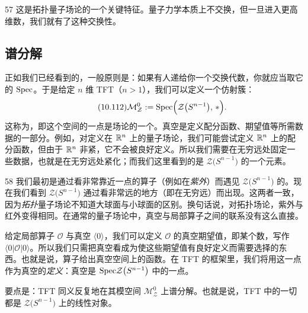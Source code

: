 \begin{srcrem}{57}
这是拓扑量子场论的一个关键特征。量子力学本质上不交换，但一旦进入更高维数，我们就有了这种交换性。
\end{srcrem}


\subsection{谱分解}\label{sec:10-6-2}

正如我们已经看到的，一般原则是：如果有人递给你一个交换代数，你就应当取它的 $\mathrm{Spec}$。于是给定 $n$ 维 TFT（$n>1$），我们可以定义一个仿射簇：
\begin{equation}\tag{10.112}
\mathcal{M}_{\mathcal{Z}}^{0}:=\mathrm{Spec}\Big(\mathcal{Z}\big(S^{n-1}\big),\,*\Big).
\end{equation}
这称为，即这个空间的一点是场论的一个。真空是定义配分函数、期望值等所需数据的一部分。例如，对定义在 $\mathbb{R}^{n}$ 上的量子场论，我们可能尝试定义 $\mathbb{R}^{n}$ 上的配分函数，但由于 $\mathbb{R}^{n}$ 非紧，它不会被良好定义。所以我们需要在无穷远处固定一些数据，也就是在无穷远处紧化；而我们这里看到的是 $\mathcal{Z}\big(S^{n-1}\big)$ 的一个元素。

\begin{srcrem}{58}
我们最初是通过看非常靠近一点的算子（例如在\emph{紫外}）而遇见 $\mathcal{Z}\big(S^{n-1}\big)$ 的。现在我们看到 $\mathcal{Z}\big(S^{n-1}\big)$ 通过看非常远的地方（即在无穷远）而出现。这两者一致，因为\emph{拓扑}量子场论不知道大球面与小球面的区别。换句话说，对拓扑场论，紫外与红外变得相同。在通常的量子场论中，真空与局部算子之间的联系没有这么直接。
\end{srcrem}

给定局部算子 $\mathcal{O}$ 与真空 $\langle0\rangle$，我们可以定义 $\mathcal{O}$ 的真空期望值，即某个数，写作 $\langle0|\mathcal{O}|0\rangle$。所以我们只需把真空看成为使这些期望值有良好定义而需要选择的东西。也就是说，算子给出真空空间上的函数。在 TFT 的框架里，我们将用这一点作为真空的\emph{定义}：真空是 $\mathrm{Spec}\mathcal{Z}\big(S^{n-1}\big)$ 中的一点。

要点是：TFT 同义反复地在其模空间 $\mathcal{M}_{\mathcal{Z}}^{0}$ 上谱分解。也就是说，TFT 中的一切都是 $\mathcal{Z}\big(S^{n-1}\big)$ 上的线性对象。

